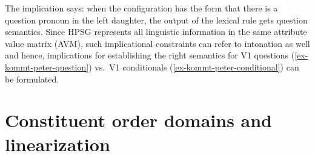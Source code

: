 \documentclass[output=paper
	        ,collection
	        ,collectionchapter
 	        ,biblatex
                ,babelshorthands
                ,newtxmath
                ,draftmode
                ,colorlinks, citecolor=brown
]{langscibook}
\begin{document}
The implication says: when the configuration has the form that there is a question pronoun in the
left daughter, the output of the lexical rule gets question semantics. Since HPSG represents all
linguistic information in the same attribute value matrix (AVM), such implicational constraints can refer to intonation as
well and hence, implications for establishing the right semantics for V1 questions (\ref{ex-kommt-peter-question}) vs.\ V1
conditionals (\ref{ex-kommt-peter-conditional}) can be formulated.



\section{Constituent order domains and linearization}
\label{sec-domains}
\end{document}
